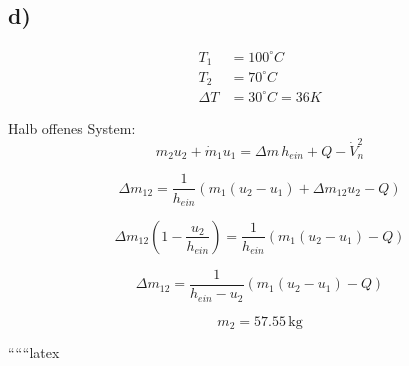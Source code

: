 

\subsection*{d)}

\begin{align*}
T_1 &= 100^\circ C \\
T_2 &= 70^\circ C \\
\Delta T &= 30^\circ C = 36K
\end{align*}

Halb offenes System:
\begin{equation*}
m_2 u_2 + \dot{m}_1 u_1 = \Delta m \, h_{ein} + Q - \dot{V}_n^2
\end{equation*}

\begin{equation*}
\Delta m_{12} = \frac{1}{h_{ein}} \left( m_1 (u_2 - u_1) + \Delta m_{12} u_2 - Q \right)
\end{equation*}

\begin{equation*}
\Delta m_{12} \left( 1 - \frac{u_2}{h_{ein}} \right) = \frac{1}{h_{ein}} \left( m_1 (u_2 - u_1) - Q \right)
\end{equation*}

\begin{equation*}
\Delta m_{12} = \frac{1}{h_{ein} - u_2} \left( m_1 (u_2 - u_1) - Q \right)
\end{equation*}

\begin{equation*}
m_2 = 57.55 \, \text{kg}
\end{equation*}

``````latex